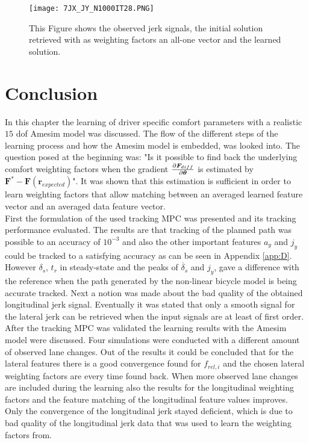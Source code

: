 \begin{figure}[h!]
	\centering
	\texttt{[image: 7JX\_JY\_N1000IT28.PNG]}
	\caption{This Figure shows the observed jerk signals, the initial solution retrieved with as weighting factors an all-one vector and the learned solution.}	
	\label{fig:complex_jerk}
\end{figure}
 \newpage                                
\section{Conclusion}
In this chapter the learning of driver specific comfort parameters with a realistic $15$ dof Amesim model was discussed. The flow of the different steps of the learning process and how the Amesim model is embedded, was looked into. The question posed at the beginning was: "Is it possible to find back the underlying comfort weighting factors when the gradient $\pdv{\bm{F}_{diff}}{\bm{\theta}}$ is estimated by $ \bm{F}^* - \bm{F}(\bm{r}_{expected})$". It was shown that this estimation is sufficient in order to learn weighting factors that allow matching between an averaged learned feature vector and an averaged data feature vector.\\

First the formulation of the used tracking MPC was presented and its tracking performance evaluated. The results are that tracking of the planned path was possible to an accuracy of $10^{-3}$ and also the other important features $a_y$ and $j_y$ could be tracked to a satisfying accuracy as can be seen in Appendix \ref{app:D}. However $\delta_s$, $t_r$ in steady-state and the peaks of $\dot{\delta_s}$ and $j_y$, gave a difference with the reference when the path generated by the non-linear bicycle model is being accurate tracked. Next a notion was made about the bad quality of the obtained longitudinal jerk signal. Eventually it was stated that only a smooth signal for the lateral jerk can be retrieved when the input signals are at least of first order. \\

After the tracking MPC was validated the learning results with the Amesim model were discussed. Four simulations were conducted with a different amount of observed lane changes. Out of the results it could be concluded that for the lateral features there is a good convergence found for $f_{rel,i}$ and the chosen lateral weighting factors are every time found back. When more observed lane changes are included during the learning also the results for the longitudinal weighting factors and the feature matching of the longitudinal feature values improves. Only the convergence of the longitudinal jerk stayed deficient, which is due to bad quality of the longitudinal jerk data that was used to learn the weighting factors from.



